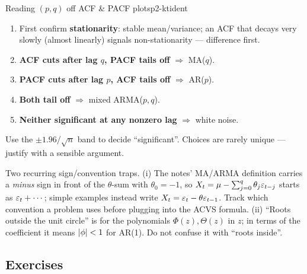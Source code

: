 \begin{keytech}{Reading $(p,q)$ off ACF \& PACF plots}{p2-ktident}
\begin{enumerate}
  \item First confirm \textbf{stationarity}: stable mean/variance; an ACF that
        decays very slowly (almost linearly) signals non-stationarity ---
        difference first.
  \item \textbf{ACF cuts after lag $q$, PACF tails off} $\Rightarrow$ MA($q$).
  \item \textbf{PACF cuts after lag $p$, ACF tails off} $\Rightarrow$ AR($p$).
  \item \textbf{Both tail off} $\Rightarrow$ mixed ARMA($p,q$).
  \item \textbf{Neither significant at any nonzero lag} $\Rightarrow$ white noise.
\end{enumerate}
Use the $\pm1.96/\sqrt n$ band to decide ``significant''. Choices are rarely
unique --- justify with a sensible argument.
\end{keytech}

\begin{pitfall}
Two recurring sign/convention traps. (i) The notes' MA/ARMA definition carries a
\emph{minus} sign in front of the $\theta$-sum with $\theta_0=-1$, so
$X_t=\mu-\sum_{j=0}^q\theta_j\varepsilon_{t-j}$ starts as $\varepsilon_t+\cdots$; simple
examples instead write $X_t=\varepsilon_t-\theta\varepsilon_{t-1}$. Track which convention a
problem uses before plugging into the ACVS formula. (ii) ``Roots outside the
unit circle'' is for the polynomials $\Phi(z),\Theta(z)$ in $z$; in terms of the
coefficient it means $\left\lvert \phi \right\rvert<1$ for AR(1). Do not confuse it with ``roots
inside''.
\end{pitfall}

\subsection{Exercises}

